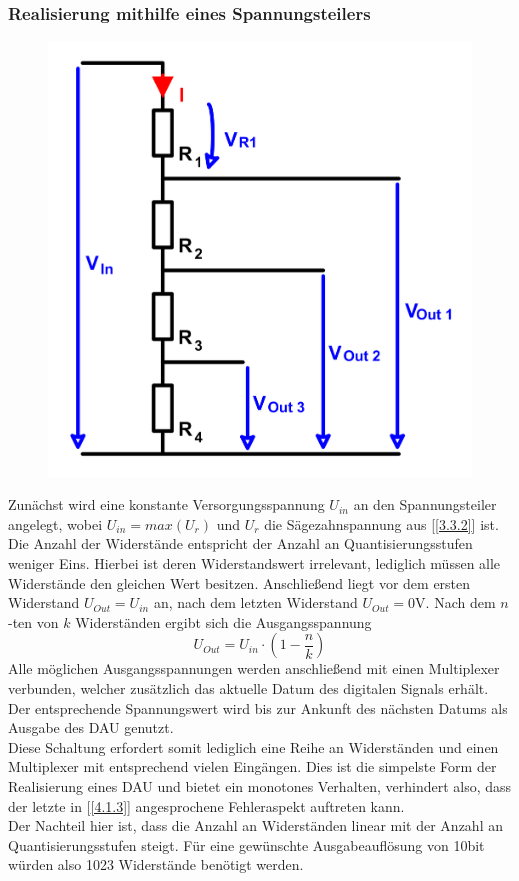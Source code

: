 \subsubsection{Realisierung mithilfe eines Spannungsteilers}
\label{4.2.1}
\begin{figure}[h!]
\centering
\includegraphics[scale=0.9]{images/spannteil.png}
\label{spannteil}
\end{figure}

Zunächst wird eine konstante Versorgungsspannung $U_{in}$ an den Spannungsteiler angelegt, wobei $U_{in} = max(U_r)$ und $U_r$ die Sägezahnspannung aus [\ref{3.3.2}] ist. Die Anzahl der Widerstände entspricht der Anzahl an Quantisierungsstufen weniger Eins. Hierbei ist deren Widerstandswert irrelevant, lediglich müssen alle Widerstände den gleichen Wert besitzen. Anschließend liegt vor dem ersten Widerstand $U_{Out} = U_{in}$ an, nach dem letzten Widerstand $U_{Out} = 0$V. Nach dem $n$-ten von $k$ Widerständen ergibt sich die Ausgangsspannung $$U_{Out} = U_{in} \cdot \left( 1 - \frac{n}{k} \right)$$
Alle möglichen Ausgangsspannungen werden anschließend mit einen Multiplexer verbunden, welcher zusätzlich das aktuelle Datum des digitalen Signals erhält. Der entsprechende Spannungswert wird bis zur Ankunft des nächsten Datums als Ausgabe des DAU genutzt.\\
Diese Schaltung erfordert somit lediglich eine Reihe an Widerständen und einen Multiplexer mit entsprechend vielen Eingängen. Dies ist die simpelste Form der Realisierung eines DAU und bietet ein monotones Verhalten, verhindert also, dass der letzte in [\ref{4.1.3}] angesprochene Fehleraspekt auftreten kann.\\
Der Nachteil hier ist, dass die Anzahl an Widerständen linear mit der Anzahl an Quantisierungsstufen steigt. Für eine gewünschte Ausgabeauflösung von 10bit würden also 1023 Widerstände benötigt werden.

